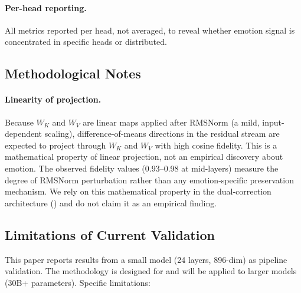 \documentclass[11pt,a4paper]{article}
\begin{document}
\paragraph{Per-head reporting.} All metrics reported per head, not
averaged, to reveal whether emotion signal is concentrated in specific
heads or distributed.

\subsection{Methodological Notes}

\paragraph{Linearity of projection.} Because $W_K$ and $W_V$ are linear
maps applied after RMSNorm (a mild, input-dependent scaling),
difference-of-means directions in the residual stream are expected to
project through $W_K$ and $W_V$ with high cosine fidelity. This is a
mathematical property of linear projection, not an empirical discovery
about emotion. The observed fidelity values (0.93--0.98 at mid-layers)
measure the degree of RMSNorm perturbation rather than any
emotion-specific preservation mechanism. We rely on this mathematical
property in the dual-correction architecture () and do
not claim it as an empirical finding.

\subsection{Limitations of Current Validation}

This paper reports results from a small model (24 layers, 896-dim) as
pipeline validation. The methodology is designed for and will be applied
to larger models (30B+ parameters). Specific limitations:
\end{document}
